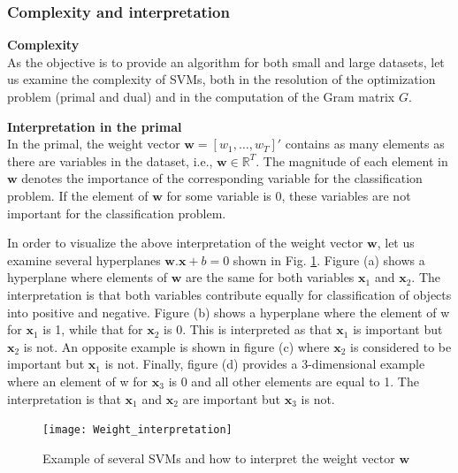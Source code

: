 \subsubsection{Complexity and interpretation}
\label{subsec:interpretation}

\noindent \textbf{Complexity} \\
As the objective is to provide an algorithm for both small and large datasets, let us examine the complexity of SVMs, both in the resolution of the optimization problem (primal and dual) and in the computation of the Gram matrix $G$.

\noindent \textbf{Interpretation in the primal} \\
In the primal, the weight vector $\textbf{w} = [w_1, \ldots, w_T]'$ contains as many elements as there are variables in the dataset, i.e., $\textbf{w} \in \mathbb{R}^T$. The magnitude of each element in $\textbf{w}$ denotes the importance of the corresponding variable for the classification problem. If the element of $\textbf{w}$ for some variable is 0, these variables are not important for the classification problem.

In order to visualize the above interpretation of the weight vector $\textbf{w}$, let us examine several hyperplanes $\textbf{w}.\textbf{x}+b=0$ shown in Fig. \ref*{fig:Weight_interpretation}. Figure (a) shows a hyperplane where elements of $\textbf{w}$ are the same for both variables $\textbf{x}_1$ and $\textbf{x}_2$. The interpretation is that both variables contribute equally for classification of objects into positive and negative. Figure (b) shows a hyperplane where the element of w for $\textbf{x}_1$ is 1, while that for $\textbf{x}_2$ is 0. This is interpreted as that $\textbf{x}_1$ is important but $\textbf{x}_2$ is not. An opposite example is shown in figure (c) where $\textbf{x}_2$ is considered to be important but $\textbf{x}_1$ is not. Finally, figure (d) provides a 3-dimensional example where an element of w for $\textbf{x}_3$ is 0 and all other elements are equal to 1. The interpretation is that $\textbf{x}_1$ and $\textbf{x}_2$ are important but $\textbf{x}_3$ is not.

\begin{figure}[h!]
	\centering
	\texttt{[image: Weight\_interpretation]}
	\caption{Example of several SVMs and how to interpret the weight vector $\textbf{w}$}
	\label{fig:Weight_interpretation}
\end{figure}

